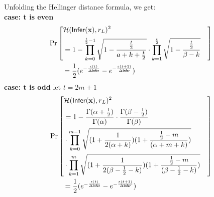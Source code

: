 \documentclass{article}
\begin{document}
Unfolding the Hellinger distance formula, we get:\\
  \noindent \textbf{case: t is even}
  \begin{align*}
  &\Pr\left[
\begin{aligned}\lefteqn{\hellinger(\bysinfer(\dataobs), r_L )^2}\\
&= 1 - \prod_{k = 0}^{\frac{t}{2} - 1}
  \sqrt{1 - \frac{\frac{t}{2}}{a + k + \frac{t}{2}}}
  \cdot\prod_{k = 1}^{\frac{t}{2}}
  \sqrt{1 - \frac{\frac{t}{2}}{\beta - k}}
\end{aligned}
\right] \\
  &\qquad = \frac{1}{2} (e^{- \frac{\epsilon (t)}{\Delta \bysinfer}} - e^{- \frac{\epsilon (t + 1)}{\Delta \bysinfer}})
  \end{align*}
  \noindent \textbf{case: t is odd}
  let $t = 2 m + 1$
  \begin{align*}
  & \Pr\left[
	\begin{aligned}\lefteqn{\hellinger(\bysinfer(\dataobs), r_L )^2} \\
  & =
  1 - \frac{\Gamma(\alpha+\frac{1}{2})}{\Gamma(\alpha)} \cdot
\frac{\Gamma(\beta - \frac{1}{2})}{\Gamma(\beta)}\\
&\cdot 
  \prod_{k = 0}^{m-1}
  \sqrt{(1 + \frac{1}{2(\alpha + k)})
  (1 + \frac{\frac{1}{2} - m}{(\alpha + m  + k)})
  }\\ &\cdot 
  \prod_{k = 1}^{m} 
  \sqrt{(1 + \frac{1}{2(\beta - \frac{1}{2}- k)})(1 + \frac{\frac{1}{2} - m}{(\beta - \frac{1}{2}- k)})} \end{aligned}
\right] \\
   &\qquad = \frac{1}{2} (e^{- \frac{\epsilon (t)}{\Delta \bysinfer}} - e^{- \frac{\epsilon (t + 1)}{\Delta \bysinfer}})
  \end{align*}
\end{document}
